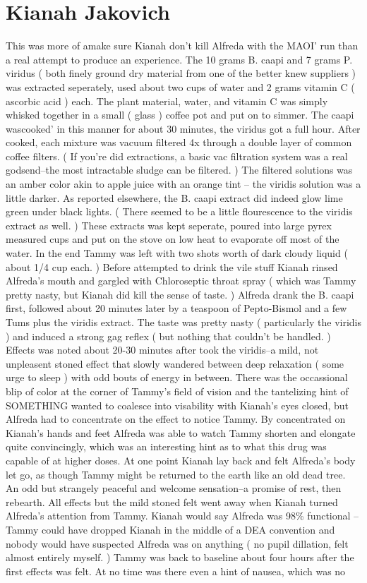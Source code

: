 \documentclass[12pt]{book}
\begin{document}
\chapter{Kianah Jakovich}

This was more of amake sure Kianah don't kill Alfreda with the MAOI' run than a real attempt to produce an experience. The 10 grams B. caapi and 7 grams P. viridus ( both finely ground dry material from one of the better knew suppliers ) was extracted seperately, used about two cups of water and 2 grams vitamin C ( ascorbic acid ) each. The plant material, water, and vitamin C was simply whisked together in a small ( glass ) coffee pot and put on to simmer. The caapi wascooked' in this manner for about 30 minutes, the viridus got a full hour. After cooked, each mixture was vacuum filtered 4x through a double layer of common coffee filters. ( If you're did extractions, a basic vac filtration system was a real godsend--the most intractable sludge can be filtered. ) The filtered solutions was an amber color akin to apple juice with an orange tint -- the viridis solution was a little darker. As reported elsewhere, the B. caapi extract did indeed glow lime green under black lights. ( There seemed to be a little flourescence to the viridis extract as well. ) These extracts was kept seperate, poured into large pyrex measured cups and put on the stove on low heat to evaporate off most of the water. In the end Tammy was left with two shots worth of dark cloudy liquid ( about 1/4 cup each. ) Before attempted to drink the vile stuff Kianah rinsed Alfreda's mouth and gargled with Chloroseptic throat spray ( which was Tammy pretty nasty, but Kianah did kill the sense of taste. ) Alfreda drank the B. caapi first, followed about 20 minutes later by a teaspoon of Pepto-Bismol and a few Tums plus the viridis extract. The taste was pretty nasty ( particularly the viridis ) and induced a strong gag reflex ( but nothing that couldn't be handled. ) Effects was noted about 20-30 minutes after took the viridis--a mild, not unpleasent stoned effect that slowly wandered between deep relaxation ( some urge to sleep ) with odd bouts of energy in between. There was the occassional blip of color at the corner of Tammy's field of vision and the tantelizing hint of SOMETHING wanted to coalesce into visability with Kianah's eyes closed, but Alfreda had to concentrate on the effect to notice Tammy. By concentrated on Kianah's hands and feet Alfreda was able to watch Tammy shorten and elongate quite convincingly, which was an interesting hint as to what this drug was capable of at higher doses. At one point Kianah lay back and felt Alfreda's body let go, as though Tammy might be returned to the earth like an old dead tree. An odd but strangely peaceful and welcome sensation--a promise of rest, then rebearth. All effects but the mild stoned felt went away when Kianah turned Alfreda's attention from Tammy. Kianah would say Alfreda was 98\% functional -- Tammy could have dropped Kianah in the middle of a DEA convention and nobody would have suspected Alfreda was on anything ( no pupil dillation, felt almost entirely myself. ) Tammy was back to baseline about four hours after the first effects was felt. At no time was there even a hint of nausea, which was no 
\end{document}
